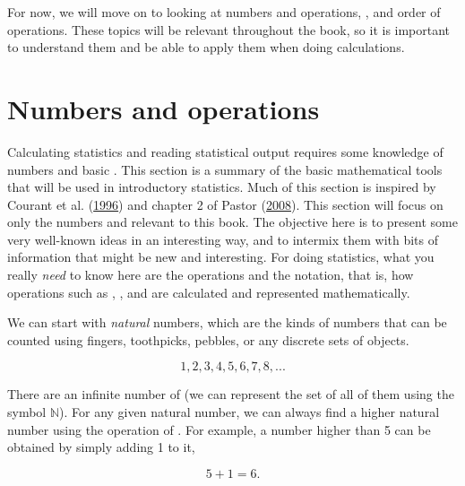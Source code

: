 \documentclass[
  openany]{krantz}
\begin{document}
For now, we will move on to looking at numbers and operations, , and order of operations.
These topics will be relevant throughout the book, so it is important to understand them and be able to apply them when doing calculations.

\hypertarget{numbers-and-operations}{%
\section{Numbers and operations}\label{numbers-and-operations}}

Calculating statistics and reading statistical output requires some knowledge of numbers and basic .
This section is a summary of the basic mathematical tools that will be used in introductory statistics.
Much of this section is inspired by Courant et al. (\protect\hyperlink{ref-Courant1996}{1996}) and chapter 2 of Pastor (\protect\hyperlink{ref-Pastor2008}{2008}).
This section will focus on only the numbers and  relevant to this book.
The objective here is to present some very well-known ideas in an interesting way, and to intermix them with bits of information that might be new and interesting.
For doing statistics, what you really \emph{need} to know here are the operations and the notation, that is, how operations such as , , and  are calculated and represented mathematically.

We can start with  \emph{natural} numbers, which are the kinds of numbers that can be counted using fingers, toothpicks, pebbles, or any discrete sets of objects.

\[1, 2, 3, 4, 5, 6, 7, 8, ...\]

There are an infinite number of  (we can represent the set of all of them using the symbol \(\mathbb{N}\)).
For any given natural number, we can always find a higher natural number using the operation of .
For example, a number higher than 5 can be obtained by simply adding 1 to it,

\[5 + 1 = 6.\]
\end{document}
